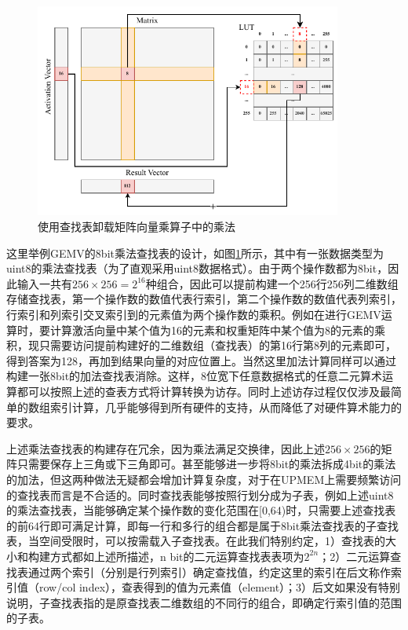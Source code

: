 \begin{figure}[!htbp]
	\centering
    \includegraphics[width=0.9\textwidth]{figures/LUT.pdf}
	\caption{使用查找表卸载矩阵向量乘算子中的乘法}
    \label{LUT}
\end{figure}

这里举例GEMV的8bit乘法查找表的设计，如图\ref{LUT}所示，其中有一张数据类型为uint8的乘法查找表（为了直观采用uint8数据格式）。由于两个操作数都为8bit，因此输入一共有$256\times 256=2^{16}$种组合，因此可以提前构建一个256行256列二维数组存储查找表，第一个操作数的数值代表行索引，第二个操作数的数值代表列索引，行索引和列索引交叉索引到的元素值为两个操作数的乘积。例如在进行GEMV运算时，要计算激活向量中某个值为16的元素和权重矩阵中某个值为8的元素的乘积，现只需要访问提前构建好的二维数组（查找表）的第16行第8列的元素即可，得到答案为128，再加到结果向量的对应位置上。当然这里加法计算同样可以通过构建一张8bit的加法查找表消除。这样，8位宽下任意数据格式的任意二元算术运算都可以按照上述的查表方式将计算转换为访存。同时上述访存过程仅仅涉及最简单的数组索引计算，几乎能够得到所有硬件的支持，从而降低了对硬件算术能力的要求。

上述乘法查找表的构建存在冗余，因为乘法满足交换律，因此上述$256\times 256$的矩阵只需要保存上三角或下三角即可。甚至能够进一步将8bit的乘法拆成4bit的乘法的加法，但这两种做法无疑都会增加计算复杂度，对于在UPMEM上需要频繁访问的查找表而言是不合适的。同时查找表能够按照行划分成为子表，例如上述uint8的乘法查找表，当能够确定某个操作数的变化范围在[0,64)时，只需要上述查找表的前64行即可满足计算，即每一行和多行的组合都是属于8bit乘法查找表的子查找表，当空间受限时，可以按需载入子查找表。在此我们特别约定，1）查找表的大小和构建方式都如上述所描述，n bit的二元运算查找表表项为$2^{2n}$；2）二元运算查找表通过两个索引（分别是行列索引）确定查找值，约定这里的索引在后文称作索引值（row/col index），查表得到的值为元素值（element）；3）后文如果没有特别说明，子查找表指的是原查找表二维数组的不同行的组合，即确定行索引值的范围的子表。

